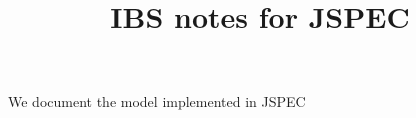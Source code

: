 \documentclass[acus]{article}
\begin{document}
\title{IBS notes for JSPEC}
\maketitle

We document the model implemented in JSPEC

\begin{thebibliography}{3}
\end{thebibliography}
\end{document}
